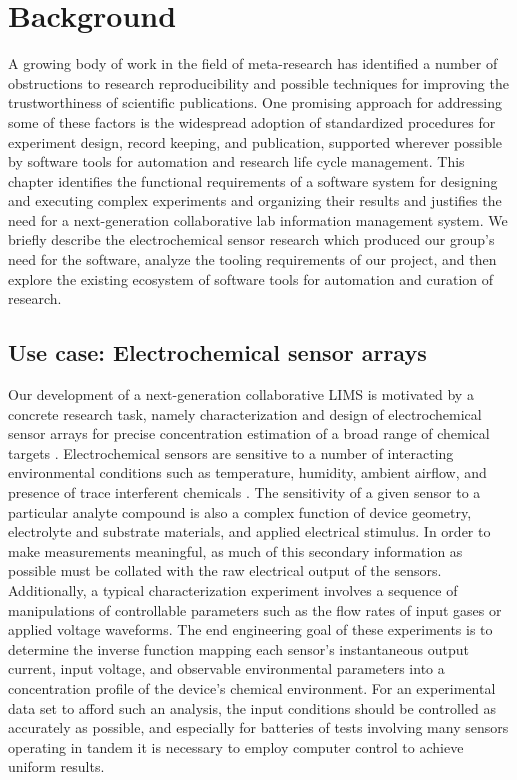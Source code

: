 \documentclass[../thesis]{subfiles}
\begin{document}
\chapter{Background}

A growing body of work in the field of meta-research has identified a
number of obstructions to research reproducibility and possible
techniques for improving the trustworthiness of scientific
publications. One promising approach for addressing some of these
factors is the widespread adoption of standardized procedures for
experiment design, record keeping, and publication, supported wherever
possible by software tools for automation and research life cycle
management. This chapter identifies the functional requirements of a
software system for designing and executing complex experiments and
organizing their results and justifies the need for a next-generation
collaborative lab information management system. We briefly describe
the electrochemical sensor research which produced our group's need
for the software, analyze the tooling requirements of our project, and
then explore the existing ecosystem of software tools for automation
and curation of research.



\section{Use case: Electrochemical sensor arrays}

Our development of a next-generation collaborative \gls{LIMS} is
motivated by a concrete research task, namely characterization and
design of electrochemical sensor arrays for precise concentration
estimation of a broad range of chemical targets \cite{Li2014,
  Wang2016, Wang2014}. Electrochemical sensors are sensitive to a
number of interacting environmental conditions such as temperature,
humidity, ambient airflow, and presence of trace interferent chemicals
\cite{Marco2012}. The sensitivity of a given sensor to a particular
analyte compound is also a complex function of device geometry,
electrolyte and substrate materials, and applied electrical
stimulus. In order to make measurements meaningful, as much of this
secondary information as possible must be collated with the raw
electrical output of the sensors. Additionally, a typical
characterization experiment involves a sequence of manipulations of
controllable parameters such as the flow rates of input gases or
applied voltage waveforms. The end engineering goal of these
experiments is to determine the inverse function mapping each sensor's
instantaneous output current, input voltage, and observable
environmental parameters into a concentration profile of the device's
chemical environment. For an experimental data set to afford such an
analysis, the input conditions should be controlled as accurately as
possible, and especially for batteries of tests involving many sensors
operating in tandem it is necessary to employ computer control to
achieve uniform results.
\end{document}
